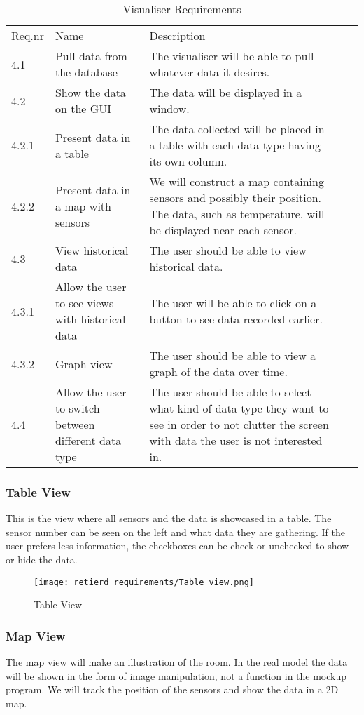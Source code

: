 \documentclass[../document]{subfiles}
\begin{document}
\begin{table}[H]
\caption{Visualiser Requirements}
\centering
\begin{tabularx}{\textwidth}{|l|X|X|l|X|}
\hline
\\ \hline Req.nr
&Name
&Description
\\ \hline 4.1
&Pull data from the database
&The visualiser will be able to pull whatever data it desires.
\\ \hline 4.2
&Show the data on the GUI
&The data will be displayed in a window.
\\ \hline 4.2.1
&Present data in a table
&The data collected will be placed in a table with each data type having its own column.
\\ \hline 4.2.2
&Present data in a map with sensors
&We will construct a map containing sensors and possibly their position. The data, such as temperature, will be displayed near each sensor.
\\ \hline 4.3
&View historical data
&The user should be able to view historical data.
\\ \hline 4.3.1
&Allow the user to see views with historical data
&The user will be able to click on a button to see data recorded earlier.
\\ \hline 4.3.2
&Graph view
&The user should be able to view a graph of the data over time.
\\ \hline 4.4
&Allow the user to switch between different data type
&The user should be able to select what kind of data type they want to see in order to not clutter the screen with data the user is not interested in.
\\ \hline 
\end{tabularx}
\end{table}

\subsubsection{Table View}
This is the view where all sensors and the data is showcased in a table. The sensor number can be seen on the left and what data they are gathering. If the user prefers less information, the checkboxes can be check or unchecked to show or hide the data.

\begin{figure}[H]
	\centering
	\texttt{[image: retierd\_requirements/Table\_view.png]}
	\caption{Table View}
\end{figure}

\subsubsection{Map View}
The map view will make an illustration of the room. In the real model the data will be shown in the form of image manipulation, not a function in the mockup program. We will track the position of the sensors and show the data in a 2D map.
\end{document}
